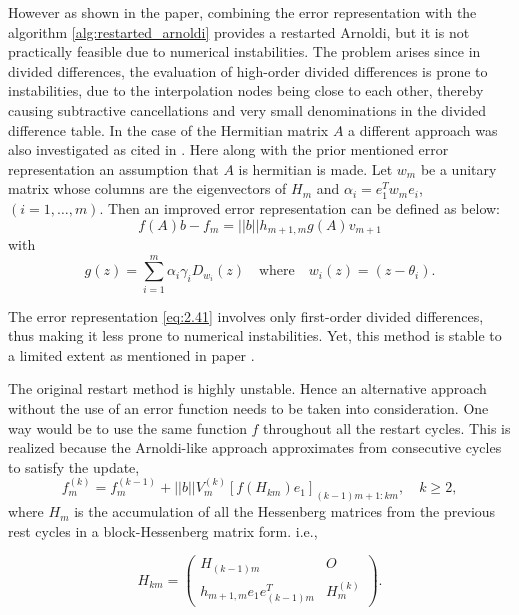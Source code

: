 However as shown in the paper, combining the error representation with the algorithm \ref{alg:restarted_arnoldi} provides a restarted Arnoldi, but it is not practically feasible due to numerical instabilities. The problem arises since in divided differences,  the evaluation of high-order divided differences is prone to instabilities, due to the interpolation nodes being close to each other, thereby causing subtractive cancellations and very small denominations in the divided difference table. In the case of the Hermitian matrix $A$ a different approach was also investigated as cited in \cite{5}. Here along with the prior mentioned error representation an assumption that $A$ is hermitian is made. Let $w_{m}$ be a unitary matrix whose columns are the eigenvectors of $H_{m}$ and $\alpha_{i}=e_{1}^{T}w_{m}e_{i}$, $(i=1,\dots,m)$. Then an improved error representation can be defined as below:
\begin{equation}
    f(A)b - f_m = ||b||h_{m+1,m}g(A)v_{m+1}
    \label{eq:2.41}
\end{equation}
with
\begin{equation}
    g(z) = \sum_{i=1}^{m} \alpha_{i} \gamma_{i} D_{w_{i}}(z) \quad \text{where} \quad w_{i}(z) = (z - \theta_{i}).
    \label{eq:2.42}
\end{equation}

The error representation \eqref{eq:2.41} involves only first-order divided differences, thus making it less prone to numerical instabilities. Yet, this method is stable to a limited extent as mentioned in paper \cite{5}.

The original restart method \cite{44} is highly unstable. Hence an alternative approach without the use of an error function needs to be taken into consideration. One way would be to use the same function $f$ throughout all the restart cycles. This is realized because the Arnoldi-like approach approximates from consecutive cycles to satisfy the update,
\begin{equation}
    f^{(k)}_{m} = f^{(k-1)}_{m} + ||b||V^{(k)}_{m} \left[ f(H_{km})e_{1} \right]_{(k-1)m+1:km}, \quad k \geq 2,
    \label{eq:2.43}
\end{equation}
where $H_{m}$ is the accumulation of all the Hessenberg matrices from the previous rest cycles in a block-Hessenberg matrix form. i.e.,

\begin{equation}
    H_{km} =
    \begin{pmatrix}
        H_{(k-1)m} & O \\
        h_{m+1,m} e_1 e_{(k-1)m}^T & H^{(k)}_m
    \end{pmatrix}.
    \label{eq:2.44}
\end{equation}

